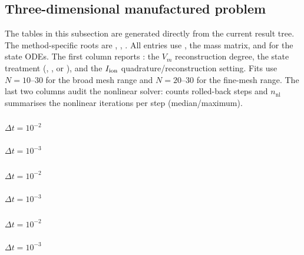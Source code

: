 \subsection{Three-dimensional manufactured problem}
\label{sec:en-results-3d}
The tables in this subsection are generated directly from the
current  result tree. The method-specific roots are , , .
All entries use , the  mass matrix, and  for the state ODEs.
The first column reports : the $V_m$ reconstruction degree, the state treatment (, , or ), and the $I_{\mathrm{ion}}$ quadrature/reconstruction setting.
Fits use $N=10$--$30$ for the broad mesh range and $N=20$--$30$ for the fine-mesh range.
The last two columns audit the nonlinear solver:  counts rolled-back steps and $n_{\mathrm{nl}}$ summarises the nonlinear iterations per step (median/maximum).

\subsubsection{}
\paragraph{$\Delta t=10^{-2}$}

\paragraph{$\Delta t=10^{-3}$}


\subsubsection{}
\paragraph{$\Delta t=10^{-2}$}

\paragraph{$\Delta t=10^{-3}$}


\subsubsection{}
\paragraph{$\Delta t=10^{-2}$}

\paragraph{$\Delta t=10^{-3}$}


